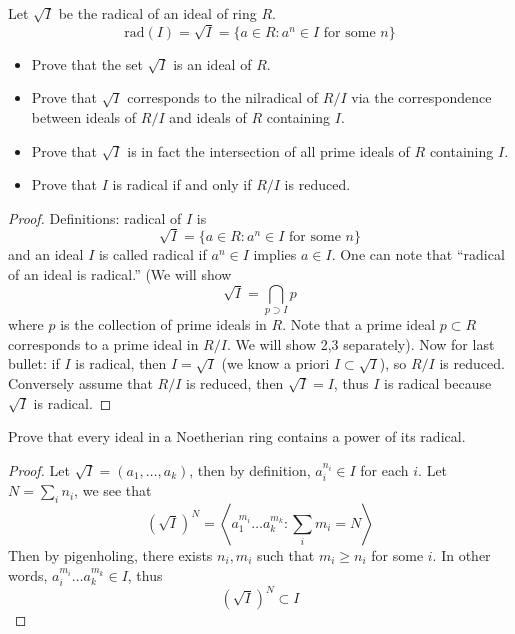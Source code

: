 \documentclass[openany]{book}
\newcommand{\la}{\langle}
\newcommand{\ra}{\rangle}
\begin{document}
    
    \begin{prob}
    Let $\sqrt{I}$ be the radical of an ideal of ring $R$.
    \begin{equation*}
        \text{rad}(I)=\sqrt{I}=\{a\in R: a^n\in I \text{ for some } n\}
    \end{equation*}
    \begin{itemize}
        \item Prove that the set \( \sqrt{I} \) is an ideal of \( R \).
        \item Prove that \( \sqrt{I} \) corresponds to the nilradical of \( R/I \) via the correspondence between ideals of \( R/I \) and ideals of \( R \) containing \( I \).
        \item Prove that \( \sqrt{I} \) is in fact the intersection of all prime ideals of \( R \) containing \( I \).
        \item Prove that \( I \) is radical if and only if \( R/I \) is reduced.
    \end{itemize}
    \end{prob}
\begin{proof}
    Definitions: radical of $I$ is 
    \begin{equation*}
        \sqrt{I}=\{a\in R: a^n\in I \text{ for some $n$}\}
    \end{equation*}
    and an ideal $I$ is called radical if $a^n\in I$ implies $a\in I$. One can note that ``radical of an ideal is radical.'' (We will show 
    \begin{equation*}
        \sqrt{I}=\bigcap_{p\supset I}p
    \end{equation*}
    where $p$ is the collection of prime ideals in $R$. Note that a prime ideal $p\subset R$ corresponds to a prime ideal in $R/I$. We will show 2,3 separately). Now for last bullet: if $I$ is radical, then $I=\sqrt{I}$ (we know a priori $I\subset\sqrt{I}$), so $R/I$ is reduced. Conversely assume that $R/I$ is reduced, then $\sqrt{I}=I$, thus $I$ is radical because $\sqrt{I}$ is radical.  
\end{proof}
    
    
    \begin{prob}
    Prove that every ideal in a Noetherian ring contains a power of its radical.
    \end{prob}
    \begin{proof}
        Let $\sqrt{I}=(a_1,\dots, a_k)$, then by definition, $a_i^{n_i}\in I$ for each $i$. Let $N=\sum_in_i$, we see that 
        \begin{equation*}
            (\sqrt{I})^N=\left\la a_1^{m_i}\dots a_k^{m_k}: \sum_im_i=N\right\ra
        \end{equation*}
        Then by pigenholing, there exists $n_i, m_i$ such that $m_i\geq n_i$ for some $i$. In other words, $a_i^{m_i}\dots a_k^{m_k}\in I$, thus 
        \begin{equation*}
           (\sqrt{I})^N\subset I
        \end{equation*}
    \end{proof}
\end{document}
